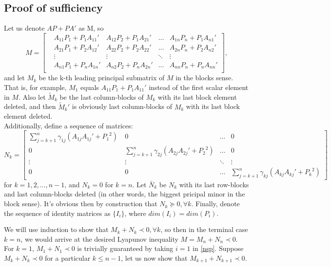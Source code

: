 \documentclass{article}
\begin{document}
\subsection{Proof of sufficiency} %
Let us denote $AP+PA'$ as M, so \[
M=\begin{bmatrix}
&A_{11}P_1+P_1A_{11}'&A_{12}P_2+P_1A_{21}'&\dots&A_{1n}P_n+P_1A_{n1}'\\
&A_{21}P_1+P_2A_{12}'&A_{22}P_2+P_2A_{22}'&\dots&A_{2n}P_n+P_2A_{n2}'\\
&\vdots&\vdots&\ddots&\vdots\\
&A_{n1}P_1+P_nA_{1n}'&A_{n2}P_2+P_nA_{2n}'&\dots&A_{nn}P_n+P_nA_{nn}'\\
\end{bmatrix},
\] and let ${M_k}$ be the k-th leading principal submatrix of ${M}$ in the blocks sense. That is, for example, ${M_1}$ equals $A_{11}P_1+P_1A_{11}'$ instead of the first scalar element in $M$. Also let $\tilde M_{k}$ be the last column-blocks of $M_{k}$ with its last block element deleted, and then $\tilde M_{k}'$ is obviously last column-blocks of $M_{k}$ with its last block element deleted.\\

Additionally, define a sequence of matrices:
\[N_k=
\begin{bmatrix}
 \sum\limits_{j=k+1}^{n}\gamma_{1j}(A_{1j}A_{1j}'+{P_1}^2)\ & 0  & \dots  & 0\\
  0 &\sum\limits_{j=k+1}^{n}{}\gamma_{2j}(A_{2j}A_{2j}'+{P_2}^2 )&  \dots  & 0 \\
    \vdots & \vdots  & \ddots & \vdots \\
    0& 0  & \dots  &\sum\limits_{j=k+1}^{n}{}\gamma_{kj}(A_{kj}A_{kj}'+{P_k}^2)
\end{bmatrix}
\]for $k=1,2,\dots, n-1$, and ${N_k}=0$ for $k=n$. Let $\bar{N}_{k}$ be ${N}_{k}$ with its last row-blocks and last column-blocks deleted (in other words, the biggest pricipal minor in the block sense). It's obvious then by construction that ${N_k}\succeq0, \forall k$. Finally, denote the sequence of identity matrices as $\{I_i\}$, where $dim(I_i)=dim(P_i)$.

We will use induction to show that $M_k+N_k\prec 0, \forall k$, so then in the terminal case $k=n$, we would arrive at the desired Lyapunov inequality $M=M_n+N_n \prec 0$. For $k=1$, $M_1+N_1\prec0$ is trivially guaranteed by taking $i=1$ in \eqref{nsp}. Suppose $M_k+N_k\prec 0$ for a particular $k\leq n-1$, let us now show that $M_{k+1}+N_{k+1}\prec 0$.\\
\end{document}
